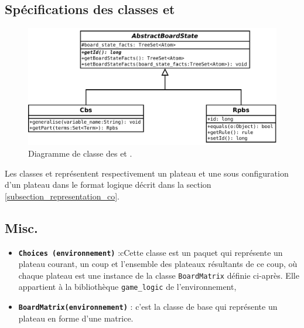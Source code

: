 \subsection{Spécifications des classes  et }
\label{subsection_cbs_rpbs}

\begin{figure}[H] 
\centering
    \includegraphics[width=\textwidth]{files/class_diagram/rpbs_cbs} 
\caption{Diagramme de classe des  et .} 
\label{img_diag_class_board_state}
\end{figure}

Les classes  et  représentent respectivement un plateau et une sous configuration d'un plateau dans le format logique décrit dans la section \vref{subsection_representation_co}. 

\subsection{Misc.}
\begin{itemize}
  \item \textbf {\texttt{\gls{Choices} (environnement)}} :cCette classe est un paquet qui représente un plateau courant, un coup et l'ensemble des plateaux résultants de ce coup, où chaque plateau est une instance de la classe \texttt{\gls{BoardMatrix}} définie ci-après. Elle appartient à la bibliothèque \texttt{\gls{game_logic}} de l'environnement,
  \item \textbf {\texttt{\gls{BoardMatrix}(environnement)}} : c'est la classe de base qui représente un plateau en forme d'une matrice. 
  \end{itemize}
